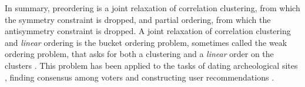 In summary, preordering is a joint relaxation of correlation clustering, from which the symmetry constraint is dropped, and partial ordering, from which the antisymmetry constraint is dropped.
A joint relaxation of correlation clustering and \emph{linear} ordering is the bucket ordering problem, sometimes called the weak ordering problem, that asks for both a clustering and a \emph{linear} order on the clusters \citep{gurgel1997adjacency,fiorini2003combinatorial,fiorini2004weak,fiorini20060}.
This problem has been applied to the tasks of dating archeological sites \citep{gionis2006algorithms}, finding consensus among voters \cite{aledo2018approaching,aledo2021highly} and constructing user recommendations \citep{jurewicz2023catalog}.